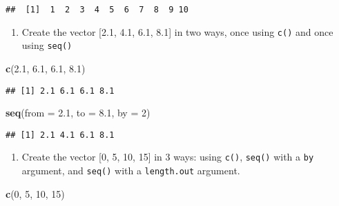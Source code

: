 \documentclass[]{book}
\newenvironment{Shaded}{\begin{snugshade}}{\end{snugshade}}
\newcommand{\KeywordTok}[1]{\textcolor[rgb]{0.13,0.29,0.53}{\textbf{{#1}}}}
\newcommand{\DataTypeTok}[1]{\textcolor[rgb]{0.13,0.29,0.53}{{#1}}}
\newcommand{\DecValTok}[1]{\textcolor[rgb]{0.00,0.00,0.81}{{#1}}}
\newcommand{\FloatTok}[1]{\textcolor[rgb]{0.00,0.00,0.81}{{#1}}}
\newcommand{\NormalTok}[1]{{#1}}
\providecommand{\tightlist}{%
  \setlength{\itemsep}{0pt}\setlength{\parskip}{0pt}}
\begin{document}
\begin{verbatim}
##  [1]  1  2  3  4  5  6  7  8  9 10
\end{verbatim}

\begin{enumerate}
\def\labelenumi{\arabic{enumi}.}
\setcounter{enumi}{1}
\tightlist
\item
  Create the vector {[}2.1, 4.1, 6.1, 8.1{]} in two ways, once using
  \texttt{c()} and once using \texttt{seq()}
\end{enumerate}

\begin{Shaded}
\begin{Highlighting}[]
\KeywordTok{c}\NormalTok{(}\FloatTok{2.1}\NormalTok{, }\FloatTok{6.1}\NormalTok{, }\FloatTok{6.1}\NormalTok{, }\FloatTok{8.1}\NormalTok{)}
\end{Highlighting}
\end{Shaded}

\begin{verbatim}
## [1] 2.1 6.1 6.1 8.1
\end{verbatim}

\begin{Shaded}
\begin{Highlighting}[]
\KeywordTok{seq}\NormalTok{(}\DataTypeTok{from =} \FloatTok{2.1}\NormalTok{, }\DataTypeTok{to =} \FloatTok{8.1}\NormalTok{, }\DataTypeTok{by =} \DecValTok{2}\NormalTok{)}
\end{Highlighting}
\end{Shaded}

\begin{verbatim}
## [1] 2.1 4.1 6.1 8.1
\end{verbatim}

\begin{enumerate}
\def\labelenumi{\arabic{enumi}.}
\setcounter{enumi}{2}
\tightlist
\item
  Create the vector {[}0, 5, 10, 15{]} in 3 ways: using \texttt{c()},
  \texttt{seq()} with a \texttt{by} argument, and \texttt{seq()} with a
  \texttt{length.out} argument.
\end{enumerate}

\begin{Shaded}
\begin{Highlighting}[]
\KeywordTok{c}\NormalTok{(}\DecValTok{0}\NormalTok{, }\DecValTok{5}\NormalTok{, }\DecValTok{10}\NormalTok{, }\DecValTok{15}\NormalTok{)}
\end{Highlighting}
\end{Shaded}
\end{document}
